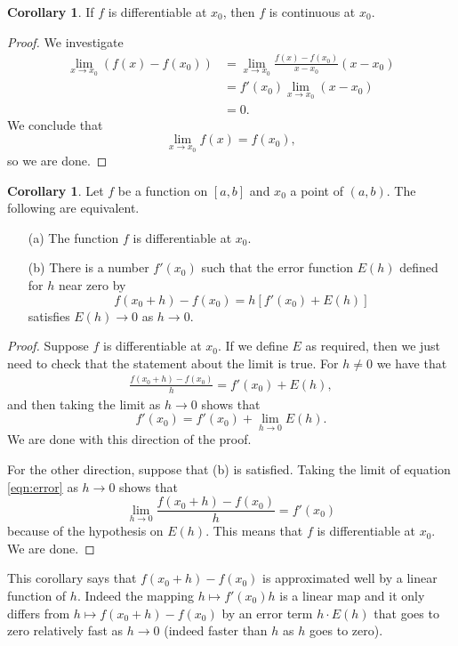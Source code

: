 \documentclass[12pt]{article}
\theoremstyle{definition}
\theoremstyle{theorem}
\newtheorem{corollary}[definition]{Corollary}
\begin{document}
\begin{corollary}
If $f$ is differentiable at $x_0$, then $f$ is continuous at $x_0$. 
\end{corollary}

\begin{proof}
We investigate 
\begin{align*}
\lim_{x \to x_0}(f(x) - f(x_0)) &= \lim_{x \to x_0} \frac{f(x) - f(x_0)}{x - x_0} (x - x_0) \\
&= f'(x_0) \lim_{x \to x_0}(x - x_0) \\
&= 0.
\end{align*}
We conclude that 
\[
\lim_{x \to x_0}f(x) = f(x_0),
\]
so we are done. 
\end{proof}

\begin{corollary}
Let $f$ be a function on $[a,b]$ and $x_0$ a point of $(a,b)$. The following are equivalent. 
\begin{enumerate}
\item[(a)] The function $f$ is differentiable at $x_0$.
\item[(b)] There is a number $f'(x_0)$ such that the error function $E(h)$ defined for $h$ near zero by  
\[
f(x_0 + h) - f(x_0) = h[f'(x_0) + E(h)]
\]
satisfies $E(h) \to 0$ as $h \to 0$. 
\end{enumerate}
\end{corollary}

\begin{proof}
Suppose $f$ is differentiable at $x_0$. If we define $E$ as required, then we just need to check that the statement about the limit is true. For $h \ne 0$ we have that 
\begin{align}\label{eqn:error}
\frac{f(x_0 + h) - f(x_0)}{h} = f'(x_0) + E(h),
\end{align}
and then taking the limit as $h \to 0$ shows that 
\[
f'(x_0) = f'(x_0) + \lim_{h \to 0} E(h).
\]
We are done with this direction of the proof. 

For the other direction, suppose that (b) is satisfied. Taking the limit of equation \eqref{eqn:error} as $h \to 0$ shows that 
\[
\lim_{h \to 0} \frac{f(x_0 + h) - f(x_0)}{h} = f'(x_0)
\]
because of the hypothesis on $E(h)$. This means that $f$ is differentiable at $x_0$. We are done. 
\end{proof}

This corollary says that $f(x_0 + h) - f(x_0)$ is approximated well by a linear function of $h$. Indeed the mapping $h \mapsto f'(x_0)h$ is a linear map and it only differs from $h \mapsto f(x_0 + h) - f(x_0)$ by an error term $h \cdot E(h)$ that goes to zero relatively fast as $h \to 0$ (indeed faster than $h$ as $h$ goes to zero). 
\end{document}
